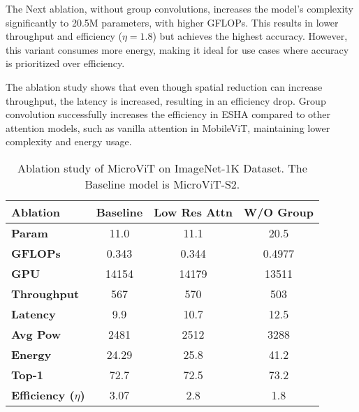 The Next ablation, without group convolutions, increases the model's complexity significantly to 20.5M parameters, with higher GFLOPs. This results in lower throughput and efficiency ($\eta=1.8$) but achieves the highest accuracy. However, this variant consumes more energy, making it ideal for use cases where accuracy is prioritized over efficiency.

The ablation study shows that even though spatial reduction can increase throughput, the latency is increased, resulting in an efficiency drop. Group convolution successfully increases the efficiency in ESHA compared to other attention models, such as vanilla attention in MobileViT, maintaining lower complexity and energy usage.

\begin{table}[!ht]
\centering
\caption{Ablation study of MicroViT  on ImageNet-1K Dataset. The Baseline model is MicroViT-S2.}
\begin{tabular}{ m{1.6cm}|c|c|c }
\hline
\textbf{Ablation} & Baseline & Low Res Attn & W/O Group  \\ \hline
\textbf{Param}      & 11.0  & 11.1  & 20.5   \\  
\textbf{GFLOPs}     & 0.343 & 0.344 & 0.4977 \\ 
\textbf{GPU}        & 14154 & 14179 & 13511  \\
\textbf{Throughput} & 567   & 570   & 503    \\
\textbf{Latency}    & 9.9   & 10.7  & 12.5   \\
\textbf{Avg Pow}    & 2481  & 2512  & 3288   \\
\textbf{Energy}     & 24.29  & 25.8  & 41.2   \\
\textbf{Top-1}      & 72.7  & 72.5  & 73.2   \\
\textbf{Efficiency ($\eta$)}& 3.07  & 2.8 & 1.8 \\
\hline


    \end{tabular}
    \label{tab:abl-result}
\end{table}


